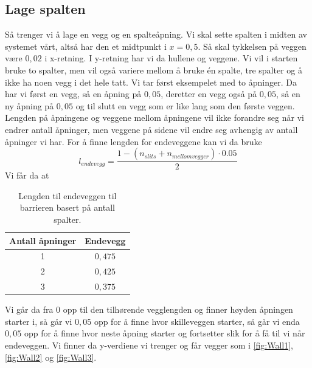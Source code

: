 \documentclass[reprint,english,notitlepage]{revtex4-2}  %
\begin{document}
\subsection{Lage spalten} \label{ssec:Spalte}
Så trenger vi å lage en vegg og en spalteåpning. Vi skal sette spalten i midten av systemet vårt, altså har den et midtpunkt i $x=0,5$. Så skal tykkelsen på veggen være $0,02$ i x-retning. I y-retning har vi da hullene og veggene. Vi vil i starten bruke to spalter, men vil også variere mellom å bruke én spalte, tre spalter og å ikke ha noen vegg i det hele tatt. Vi tar først eksempelet med to åpninger. Da har vi først en vegg, så en åpning på $0,05$, deretter en vegg også på $0,05$, så en ny åpning på $0,05$ og til slutt en vegg som er like lang som den første veggen. Lengden på åpningene og veggene mellom åpningene vil ikke forandre seg når vi endrer antall åpninger, men veggene på sidene vil endre seg avhengig av antall åpninger vi har. For å finne lengden for endeveggene kan vi da bruke
$$
l_{endevegg}=\frac{1-(n_{slits}+n_{mellomvegger})\cdot 0.05}{2}
$$
Vi får da at
\begin{table}[H]
\centering 
	\begin{tabular}{|c|c|}
		\hline
		Antall åpninger & Endevegg \\
		\hline 
		1 & $0,475$ \\
		\hline
		2& $0,425$ \\ \hline 
		3& $0,375$ \\ \hline
		
	\end{tabular}
	\caption{Lengden til endeveggen til barrieren basert på antall spalter.}
\end{table}
Vi går da fra 0 opp til den tilhørende vegglengden og finner høyden åpningen starter i, så går vi $0,05$ opp for å finne hvor skilleveggen starter, så går vi enda $0,05$ opp for å finne hvor neste åpning starter og fortsetter slik for å få til vi når endeveggen. Vi finner da y-verdiene vi trenger og får vegger som i \autoref{fig:Wall1}, \autoref{fig:Wall2} og \autoref{fig:Wall3}.
\end{document}
